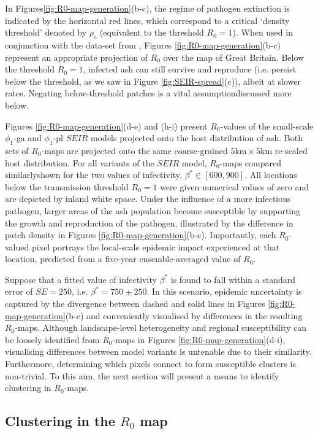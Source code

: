In Figures\ref{fig:R0-map-generation}(b-c), the regime of pathogen extinction is indicated by the horizontal red lines, 
which correspond to a critical `density threshold' denoted by $\rho_c$ (equivalent to the threshold $R_0 = 1$).
When used in conjunction with the data-set from \cite{hill.data}, Figures \ref{fig:R0-map-generation}(b-c) represent an appropriate projection of $R_0$ over the map of Great Britain.
Below the threshold $R_0=1$, infected ash can still survive and reproduce (i.e. persist below the threshold, as we saw in Figure \ref{fig:SEIR-spread}(c)), albeit at slower rates.
Negating below-threshold patches is a vital assumption\textemdash discussed more below.

Figures \ref{fig:R0-map-generation}(d-e) and (h-i) present $R_0$-values of the small-scale $\phi_1$-ga and $\phi_1$-pl $SEIR$ models projected onto the host distribution of ash.
Both sets of $R_0$-maps are projected onto the same coarse-grained $5\mathrm{km} \times 5\mathrm{km}$ re-scaled host distribution.
For all variants of the $SEIR$ model, $R_0$-maps compared similarly\textemdash shown for the two values of infectivity, $\beta^* \in [600, 900]$.
All locations below the transmission threshold $R_0=1$ were given numerical values of zero and are depicted by inland white space.
Under the influence of a more infectious pathogen, larger areas of the ash population become susceptible by supporting the growth and reproduction of the pathogen, illustrated by the difference in patch density in Figures \ref{fig:R0-map-generation}(b-c). 
Importantly, each $R_0$-valued pixel portrays the local-scale epidemic impact experienced at that location, predicted from a five-year ensemble-averaged value of $R_0$.

Suppose that a fitted value of infectivity $\beta^*$ is found to fall within a standard error of $SE=250$,  i.e. $\beta^* = 750 \pm 250$.
In this scenario, epidemic uncertainty is captured by the divergence between dashed and solid lines in Figures \ref{fig:R0-map-generation}(b-c)
and conveniently visualised by differences in the resulting $R_0$-maps.
Although landscape-level heterogeneity and regional susceptibility can be loosely identified from $R_0$-maps in Figures \ref{fig:R0-map-generation}(d-i),
visualising differences between model variants is untenable due to their similarity. 
Furthermore, determining which pixels connect to form susceptible clusters is non-trivial. 
To this aim, the next section will present a means to identify clustering in $R_0$-maps.

\subsection{Clustering in the $R_0$ map}
\label{sec:r0-clustering}

